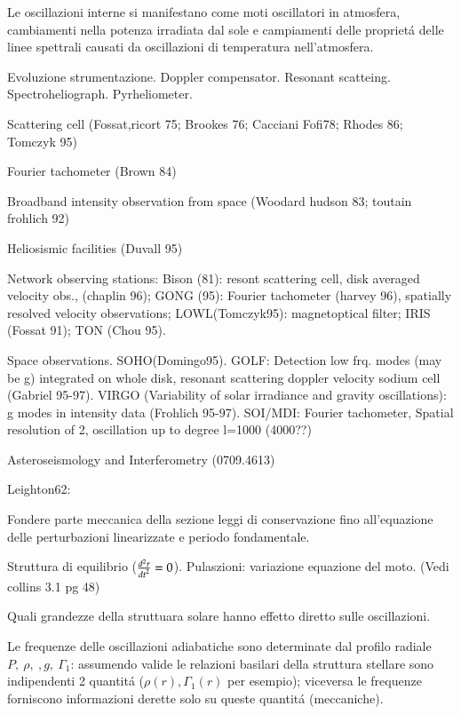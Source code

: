 \documentclass[../main.tex]{subfiles}
\begin{document}
\begin{itemize*}
Le oscillazioni interne si manifestano come moti oscillatori in atmosfera, cambiamenti nella potenza irradiata dal sole e campiamenti delle propriet\'a delle linee spettrali causati da oscillazioni di temperatura nell'atmosfera.
\item Evoluzione strumentazione. Doppler compensator. Resonant scatteing. Spectroheliograph. Pyrheliometer.
\item Scattering cell (Fossat,ricort 75; Brookes 76; Cacciani Fofi78; Rhodes 86; Tomczyk 95)
\item Fourier tachometer (Brown 84)
\item Broadband intensity observation from space (Woodard hudson 83; toutain frohlich 92)
\item Heliosismic facilities (Duvall 95)
\item Network observing stations: Bison (81): resont scattering cell, disk averaged velocity obs., (chaplin 96); GONG (95): Fourier tachometer (harvey 96), spatially resolved velocity observations; LOWL(Tomczyk95): magnetoptical filter; IRIS (Fossat 91); TON (Chou 95).
\item Space observations. SOHO(Domingo95). GOLF: Detection low frq. modes (may be g) integrated on whole disk, resonant scattering doppler velocity sodium cell (Gabriel 95-97). VIRGO (Variability of solar irradiance and gravity oscillations): g modes in intensity data (Frohlich 95-97). SOI/MDI: Fourier tachometer, Spatial resolution of \SI{2}{\arcsec}, oscillation up to degree l=1000 (4000??)
\item  Asteroseismology and Interferometry (0709.4613)
\item Leighton62:
\item Fondere parte meccanica della sezione leggi di conservazione fino all'equazione delle perturbazioni linearizzate e periodo fondamentale.
\item Struttura di equilibrio ($\TtwoDy{t}{r}=0$). Pulaszioni: variazione equazione del moto. (Vedi collins 3.1 pg 48)


\item Quali grandezze della struttuara solare hanno effetto diretto sulle oscillazioni.

Le frequenze delle oscillazioni adiabatiche sono determinate dal profilo radiale $P,\ \rho,\ ,g,\ \Gamma_1$: assumendo valide le relazioni basilari della struttura stellare  sono indipendenti 2  quantit\'a ($\rho(r),\Gamma_1(r)$ per esempio); viceversa le frequenze forniscono informazioni derette solo su queste quantit\'a (meccaniche).


\end{itemize*}
\end{document}
